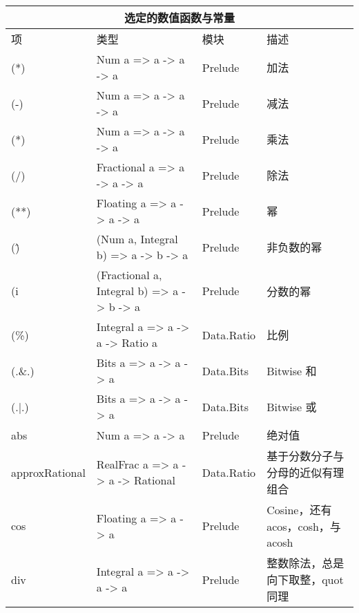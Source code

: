 \documentclass[./main.tex]{subfiles}
\begin{document}
\begin{center}
  \begin{tabular}{|l|p{6cm}|l|p{3cm}|}
    \hline
    \multicolumn{4}{|c|}{\textbf{选定的数值函数与常量}}                                                             \\
    \hline
    项              & 类型                                        & 模块         & 描述                          \\
    \hline
    (*)            & Num a => a -> a -> a                      & Prelude    & 加法                          \\
    (-)            & Num a => a -> a -> a                      & Prelude    & 减法                          \\
    (*)            & Num a => a -> a -> a                      & Prelude    & 乘法                          \\
    (/)            & Fractional a => a -> a -> a               & Prelude    & 除法                          \\
    (**)           & Floating a => a -> a -> a                 & Prelude    & 幂                           \\
    (\^)           & (Num a, Integral b) => a -> b -> a        & Prelude    & 非负数的幂                       \\
    (^^)           & (Fractional a, Integral b) => a -> b -> a & Prelude    & 分数的幂                        \\
    (\%)           & Integral a => a -> a -> Ratio a           & Data.Ratio & 比例                          \\
    (.\&.)         & Bits a => a -> a -> a                     & Data.Bits  & Bitwise 和                   \\
    (.|.)          & Bits a => a -> a -> a                     & Data.Bits  & Bitwise 或                   \\
    abs            & Num a => a -> a                           & Prelude    & 绝对值                         \\
    approxRational & RealFrac a => a -> a -> Rational          & Data.Ratio & 基于分数分子与分母的近似有理组合            \\
    cos            & Floating a => a -> a                      & Prelude    & Cosine，还有 acos，cosh，与 acosh \\
    div            & Integral a => a -> a -> a                 & Prelude    & 整数除法，总是向下取整，quot 同理         \\

\end{tabular}
\end{center}
\end{document}
